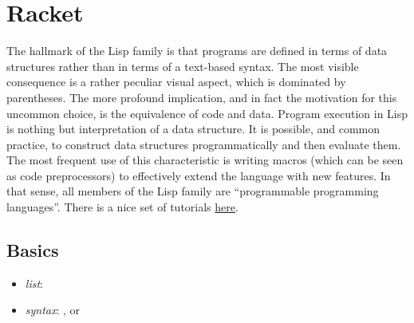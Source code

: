 \section{Racket}

The hallmark of the Lisp family is that programs are defined in terms of data structures rather than in terms of a text-based syntax. The most visible consequence is a rather peculiar visual aspect, which is dominated by parentheses. The more profound implication, and in fact the motivation for this uncommon choice, is the equivalence of code and data. Program execution in Lisp is nothing but interpretation of a data structure. It is possible, and common practice, to construct data structures programmatically and then evaluate them. The most frequent use of this characteristic is writing macros (which can be seen as code preprocessors) to effectively extend the language with new features. In that sense, all members of the Lisp family are “programmable programming languages”. 
There is a nice set of tutorials \href{https://beautifulracket.com/stacker/}{here}.

\subsection{Basics}

\begin{itemize}
  \item \emph{list}: 
  \item \emph{syntax}: , or 
\end{itemize}

